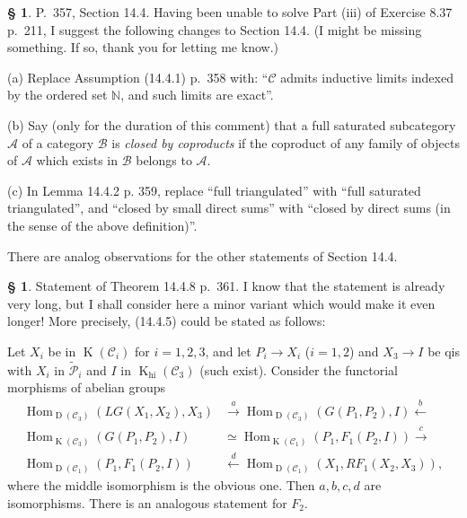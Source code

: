 \documentclass[12pt]{article}
\theoremstyle{remark}
\theoremstyle{definition}
\newtheorem{s}[thm]{\S}
\newcommand{\nn}{\noindent}
\newcommand{\mc}{\mathcal}
\newcommand{\bb}{\mathbb}
\newcommand{\oo}{\operatorname}
\newcommand{\A}{\mathcal A}
\newcommand{\B}{\mathcal B}
\newcommand{\C}{\mathcal C}
\newcommand{\xr}{\xrightarrow}
\DeclareMathOperator{\Hom}{Hom}
\begin{document}
%

\begin{s}%
P.~357, Section 14.4. Having been unable to solve Part (iii) of Exercise 8.37 p.~211, I suggest the following changes to Section 14.4. (I might be missing something. If so, thank you for letting me know.)

\nn(a) Replace Assumption (14.4.1) p.~358 with: ``$\C$ admits inductive limits indexed by the ordered set $\bb N$, and such limits are exact''.

\nn(b) Say (only for the duration of this comment) that a full saturated subcategory $\A$ of a category $\B$ is {\em closed by coproducts} if the coproduct of any family of objects of $\A$ which exists in $\B$ belongs to $\A$.

\nn(c) In Lemma 14.4.2 p. 359, replace ``full triangulated'' with ``full saturated triangulated'', and ``closed by small direct sums'' with ``closed by direct sums (in the sense of the above definition)''. 

There are analog observations for the other statements of Section 14.4.
\end{s}

%

\begin{s}%
Statement of Theorem 14.4.8 p.~361. I know that the statement is already very long, but I shall consider here a minor variant which would make it even longer! More precisely, (14.4.5) could be stated as follows:

Let $X_i$ be in $\oo K(\C_i)$ for $i=1,2,3$, and let $P_i\to X_i$ ($i=1,2$) and $X_3\to I$ be qis with $X_i$ in $\widetilde{\mc P}_i$ and $I$ in $\oo K_{\oo{hi}}(\C_3)$ (such exist). Consider the functorial morphisms of abelian groups
\begin{equation}\label{1448}
\begin{split}
\Hom_{\oo D(\C_3)}(LG(X_1,X_2),X_3)&\xr a\Hom_{\oo D(\C_3)}(G(P_1,P_2),I)\xleftarrow b\\ 
\Hom_{\oo K(\C_3)}(G(P_1,P_2),I)&\simeq\Hom_{\oo K(\C_1)}(P_1,F_1(P_2,I))\xr c\\ 
\Hom_{\oo D(\C_1)}(P_1,F_1(P_2,I))&\xleftarrow d\Hom_{\oo D(\C_1)}(X_1,RF_1(X_2,X_3)),
\end{split}
\end{equation}
where the middle isomorphism is the obvious one. Then $a,b,c,d$ are isomorphisms. There is an analogous statement for $F_2$.
\end{s}

%
\end{document}
